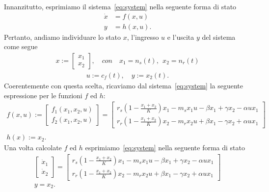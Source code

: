 \documentclass[a4paper, 11pt]{article}
\begin{document}
Innanzitutto, esprimiamo il sistema~\eqref{eq:system} nella seguente forma di stato
%
\begin{subequations}
\begin{align}\label{eq:state_form}
	\dot{x} &= f(x,u)
	\\
	y &= h(x,u).
\end{align}
\end{subequations}
%
Pertanto, andiamo individuare lo stato $x$, l'ingresso $u$ e l'uscita $y$ del sistema come segue 
%
\begin{align*}
	x := 
    \begin{bmatrix} x_1 \\ x_2\end{bmatrix},\quad con \quad x_1=n_s(t), \:\: x_2=n_r(t)
\end{align*}
\begin{align*}
    u := c_f(t), \quad y := x_2(t).
\end{align*}
%
Coerentemente con questa scelta, ricaviamo dal sistema~\eqref{eq:system} la seguente espressione per le funzioni $f$ ed $h$:
%
\begin{gather*}
	f(x,u) := \begin{bmatrix} f_1(x_1,x_2,u) \\ f_2(x_1,x_2,u)\end{bmatrix} = 
    \begin{bmatrix} 
    r_s \left( 1 - \frac{x_1 + x_2}{K} \right) x_1 - m_s x_1 u- \beta x_1 + \gamma x_2 - \alpha u x_1
    \\
    r_r \left( 1 - \frac{x_1 + x_2}{K} \right) x_2 - m_r x_2 u + \beta x_1 - \gamma x_2 + \alpha u x_1
    \end{bmatrix}
	\\
    \\
	h(x) := x_2.
\end{gather*}
%
Una volta calcolate $f$ ed $h$ esprimiamo~\eqref{eq:system} nella seguente forma di stato
%
\begin{subequations}\label{eq:our_system_state_form}
\begin{gather}
	\begin{bmatrix}
		\dot{x}_1
		\\
        \dot {x}_2
	\end{bmatrix} = 
    \begin{bmatrix}
	r_s \left( 1 - \frac{x_1 + x_2}{K} \right) x_1 - m_s x_1 u- \beta x_1 + \gamma x_2 - \alpha u x_1
    \\
    r_r \left( 1 - \frac{x_1 + x_2}{K} \right) x_2 - m_r x_2 u + \beta x_1 - \gamma x_2 + \alpha u x_1
	\end{bmatrix}  
    \label{eq:state_form_1}
	\\
	y = x_2.
\end{gather}
\end{subequations}
\end{document}
